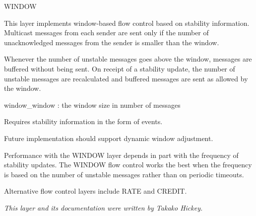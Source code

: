 \begin{Layer}{WINDOW} 

This layer implements window-based flow control based on stability information.
Multicast messages from each sender are sent only if the number of
unacknowledged messages from the sender is smaller than the window.

\begin{Protocol}
Whenever the number of unstable messages goes above the window, messages
are buffered without being sent.  On receipt of a stability update, the
number of unstable messages are recalculated and buffered messages are sent
as allowed by the window.
\end{Protocol}

\begin{Parameters}
\item window\_window : the window size in number of messages
\end{Parameters}

\begin{Properties}
\item
Requires stability information in the form of  events.
\end{Properties}

\begin{Notes}
\item 
Future implementation should support dynamic window adjustment.
\item 
Performance with the WINDOW layer depends in part with the frequency of
stability updates.  The WINDOW flow control works the best when the
frequency is based on the number of unstable messages rather than on
periodic timeouts.
\item 
Alternative flow control layers include RATE and CREDIT.
\end{Notes}

\begin{Sources}
\end{Sources}

\emph{This layer and its documentation were written by Takako Hickey.}
\end{Layer}
